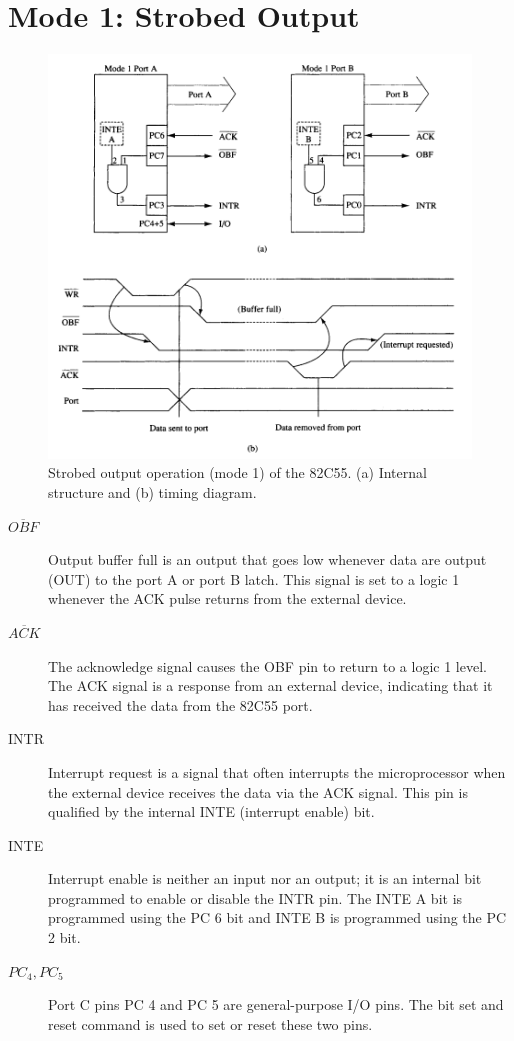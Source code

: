 \section{Mode 1: Strobed Output}
\begin{figure}[h!]
  \includegraphics[width = 1.2\textwidth]{./figures/Strobed_Output.png}
  \caption{Strobed output operation (mode 1) of the 82C55. (a) Internal structure and (b) timing diagram.}
\end{figure}

\begin{description}
  \item[$\overline{OBF}$] Output buffer full is an output that goes low whenever data are output (OUT) to the port A or port B latch. This signal is set to a logic 1 whenever the ACK pulse returns from the external device.
  \item[$\overline{ACK}$] The acknowledge signal causes the OBF pin to return to a logic 1 level. The ACK signal is a response from an external device, indicating that it has received the data from the 82C55 port.
  \item[INTR] Interrupt request is a signal that often interrupts the microprocessor when the external device receives the data via the ACK signal. This pin is qualified by the internal INTE (interrupt enable) bit.
  \item[INTE] Interrupt enable is neither an input nor an output; it is an internal bit programmed to enable or disable the INTR pin. The INTE A bit is programmed using the PC 6 bit and INTE B is programmed using the PC 2 bit.
  \item[$PC_4 , PC_5$] Port C pins PC 4 and PC 5 are general-purpose I/O pins. The bit set and reset command is used to set or reset these two pins.
\end{description}

